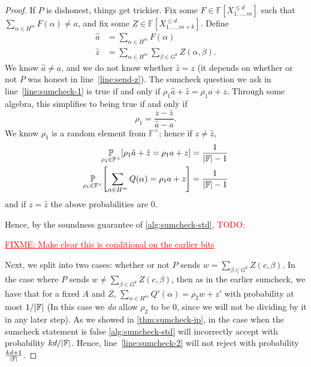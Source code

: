 \documentclass[english,12pt]{reedthesis}
\theoremstyle{plain}
\theoremstyle{definition}
\theoremstyle{remark}
\DeclarePairedDelimiter{\abs}{\lvert}{\rvert}
\newcommand{\TODO}[1]{\textcolor{red}{TODO: #1}}
\newcommand{\FIXME}[1]{\textcolor{red}{\ul{FIXME: #1}}}
\begin{document}
\begin{proof}
  If $P$ is dishonest, things get trickier. Fix some
  $F \in \mathbb{F}[X_{1, \ldots, m}^{\le d}]$ such that $\sum_{\alpha \in H^{m}}F(\alpha) \ne a$, and fix
  some $Z \in \mathbb{F}[X_{1, \ldots, m+k}^{\le d}]$. Define
  \begin{align*}
    \hat{a} &= \sum_{\alpha \in H^{m}}F(\alpha) \\
    \hat{z} &= \sum_{\alpha \in H^{m}}\sum_{\beta \in G^{k}}Z(\alpha, \beta).
  \end{align*}
  We know $\hat{a} \ne a$, and we do not know whether $\hat{z} = z$ (it depends on
  whether or not $P$ was honest in line~\ref{line:send-z}). The sumcheck
  question we ask in line~\ref{line:sumcheck-1} is true if and only if
  $\rho_{1}\hat{a} + \hat{z} = \rho_{1}a + z$. Through some algebra, this simplifies
  to being true if and only if
  \begin{equation}
    \rho_{1} = \frac{z - \hat{z}}{\hat{a} - a}.
  \end{equation}
  We know $\rho_{1}$ is a random element from $\mathbb{F}^{\times}$; hence if
  $z \ne \hat{z}$,
  \begin{align}
    \underset{\rho_{1} \in \mathbb{F}^{\times}}{\mathbb{P}}[\rho_{1}\hat{a} + \hat{z} = \rho_{1}a + z] &= \frac{1}{\abs{\mathbb{F}} - 1} \\
    \underset{\rho_{1} \in \mathbb{F}^{\times}}{\mathbb{P}}\mleft[\sum_{\alpha \in H^{m}}Q(\alpha) = \rho_{1}a + z\mright] &= \frac{1}{\abs{\mathbb{F}} - 1}
  \end{align}
  and if $z = \hat{z}$ the above probabilities are 0.

  Hence, by the soundness guarantee of \cref{alg:sumcheck-std}, \TODO{}

  \FIXME{Make clear this is conditional on the earlier bits}

  Next, we split into two cases: whether or not $P$ sends
  $w = \sum_{\beta \in G^{k}}Z(c, \beta)$. In the case where $P$ sends
  $w \ne \sum_{\beta \in G^{k}}Z(c, \beta)$, then as in the earlier sumcheck, we have that for
  a fixed $A$ and $Z$, $\sum_{\alpha \in H^{m}}Q'(\alpha) = \rho_{2}w + z'$ with probability at
  most $1/\abs{\mathbb{F}}$ (In this case we \emph{do} allow $\rho_{2}$ to be 0,
  since we will not be dividing by it in any later step). As we showed in
  \cref{thm:sumcheck-ip}, in the case when the sumcheck statement is false
  \cref{alg:sumcheck-std} will incorrectly accept with probability
  $kd/\abs{\mathbb{F}}$. Hence, line~\ref{line:sumcheck-2} will not reject with
  probability $\frac{kd + 1}{\abs{\mathbb{F}}}$.


\end{proof}
\end{document}
